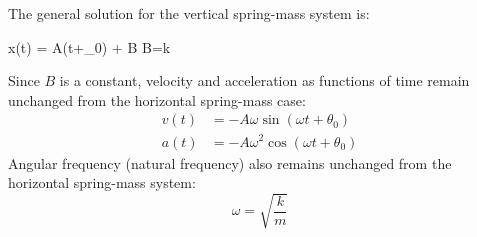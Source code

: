 The general solution for the vertical spring-mass system is:
\begin{important-equation}
  \quad
  x(t) = A\cos(\omega t+\theta_0) + B
  \quad{}\quad
  B=k
  \label{eq:ode1a}
\end{important-equation}

Since $B$ is a constant, velocity and acceleration as functions of time remain
unchanged from the horizontal spring-mass case:
\begin{align*}
  v(t) &= -A\omega\sin(\omega t+\theta_0)\\
  a(t) &= -A\omega^2\cos(\omega t+\theta_0)
\end{align*}
Angular frequency (natural frequency) also remains unchanged from the horizontal
spring-mass system:
\begin{equation*}
  \omega=\sqrt{\frac km}
\end{equation*}


